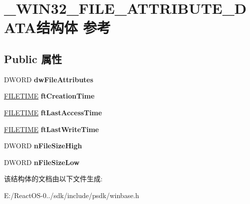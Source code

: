 \hypertarget{struct___w_i_n32___f_i_l_e___a_t_t_r_i_b_u_t_e___d_a_t_a}{}\section{\+\_\+\+W\+I\+N32\+\_\+\+F\+I\+L\+E\+\_\+\+A\+T\+T\+R\+I\+B\+U\+T\+E\+\_\+\+D\+A\+T\+A结构体 参考}
\label{struct___w_i_n32___f_i_l_e___a_t_t_r_i_b_u_t_e___d_a_t_a}
\subsection*{Public 属性}
\begin{DoxyCompactItemize}
\item 
\mbox{\label{struct___w_i_n32___f_i_l_e___a_t_t_r_i_b_u_t_e___d_a_t_a_a3932ddff54e71c5335088431300a6a0e}} 
D\+W\+O\+RD {\bfseries dw\+File\+Attributes}
\item 
\mbox{\label{struct___w_i_n32___f_i_l_e___a_t_t_r_i_b_u_t_e___d_a_t_a_a29185e73f2d177cb31eb771c5fb503ab}} 
\hyperlink{struct___f_i_l_e_t_i_m_e}{F\+I\+L\+E\+T\+I\+ME} {\bfseries ft\+Creation\+Time}
\item 
\mbox{\label{struct___w_i_n32___f_i_l_e___a_t_t_r_i_b_u_t_e___d_a_t_a_a19d4e642e04b295035073503adf4d891}} 
\hyperlink{struct___f_i_l_e_t_i_m_e}{F\+I\+L\+E\+T\+I\+ME} {\bfseries ft\+Last\+Access\+Time}
\item 
\mbox{\label{struct___w_i_n32___f_i_l_e___a_t_t_r_i_b_u_t_e___d_a_t_a_a636a4e5f902ae14fbe2a460489df399c}} 
\hyperlink{struct___f_i_l_e_t_i_m_e}{F\+I\+L\+E\+T\+I\+ME} {\bfseries ft\+Last\+Write\+Time}
\item 
\mbox{\label{struct___w_i_n32___f_i_l_e___a_t_t_r_i_b_u_t_e___d_a_t_a_a6806b28db7254f6f646ee903a5c82e7e}} 
D\+W\+O\+RD {\bfseries n\+File\+Size\+High}
\item 
\mbox{\label{struct___w_i_n32___f_i_l_e___a_t_t_r_i_b_u_t_e___d_a_t_a_ae66b432ae7abd3ef8f409715e11c1b20}} 
D\+W\+O\+RD {\bfseries n\+File\+Size\+Low}
\end{DoxyCompactItemize}


该结构体的文档由以下文件生成\+:\begin{DoxyCompactItemize}
\item 
E\+:/\+React\+O\+S-\/0../sdk/include/psdk/winbase.\+h\end{DoxyCompactItemize}
